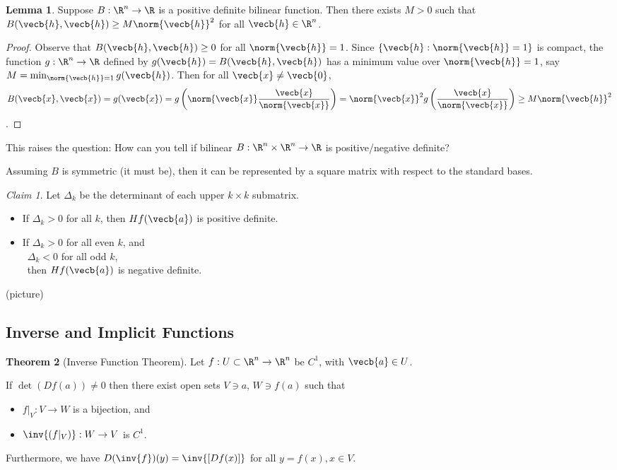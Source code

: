 \documentclass[a5paper]{article}
\theoremstyle{definition}%
\newtheorem{theorem}{Theorem}
\newtheorem{lemma}[theorem]{Lemma}
\numberwithin{exercise}{section}
\theoremstyle{remark}%
\newtheorem*{claim}{Claim}
\begin{document}
\begin{highlight}
\begin{lemma}
Suppose $B:\R^n\to \R$ is a positive definite bilinear function. Then there exists $M>0$ such that $B(\vecb{h}, \vecb{h})\geq M \norm{\vecb{h}}^2$ for all $\vecb{h}\in\R^n$. 
\end{lemma}
\end{highlight}
\begin{proof}
Observe that $B(\vecb{h}, \vecb{h})\geq 0$ for all $\norm{\vecb{h}} =1$. Since $\{\vecb{h}: \norm{\vecb{h}} =1\}$ is compact, the function $g:\R^n\to \R$ defined by $g(\vecb{h})=B(\vecb{h}, \vecb{h})$ has a minimum value over $\norm{\vecb{h}} =1$, say $M=\min_{\norm{\vecb{h}} =1}g(\vecb{h})$. Then for all $\vecb{x}\neq\vecb{0}$, $$B(\vecb{x},\vecb{x})=g(\vecb{x})=g\left(\norm{\vecb{x}}\frac{\vecb{x}}{\norm{\vecb{x}}}\right)=\norm{\vecb{x}}^2g\left(\frac{\vecb{x}}{\norm{\vecb{x}}}\right)\geq M \norm{\vecb{h}}^2$$.
\end{proof}

This raises the question: How can you tell if bilinear $B:\R^n\times \R^n \to \R$ is positive/negative definite?

Assuming $B$ is symmetric (it must be), then it can be represented by a square matrix with respect to the standard bases. 

\begin{highlight}
\begin{claim}
Let $\Delta_k$ be the determinant of each upper $k\times k$ submatrix. 
\begin{itemize}
\item If $\Delta_k>0$ for all $k$, then $Hf(\vecb{a})$ is positive definite. 
\item If $\Delta_k>0$ for all even $k$, and \\ \mbox{} \, $\Delta_k<0$ for all odd $k$, \\ \mbox{} \, then $Hf(\vecb{a})$ is negative definite. 
\end{itemize}
\end{claim}
\end{highlight}

(picture)

\subsection{Inverse and Implicit Functions}

\begin{highlight}
\begin{theorem}[Inverse Function Theorem]
Let $f:U\subset \R^n\to \R^n$ be $C^1$, with $\vecb{a}\in U$.

If $\det(Df(a))\neq 0$ then there exist open sets $V\ni a$, $W\ni f(a)$ such that 
\begin{itemize}
\item $f|_V:V\to W$ is a bijection, and 
\item $\inv{(f|_V)}:W\to V$ is $C^1$. 
\end{itemize}
Furthermore, we have $D(\inv{f})(y)=\inv{[Df(x)]}$ for all $y=f(x), x\in V$. 
\end{theorem}
\end{highlight}
\end{document}
